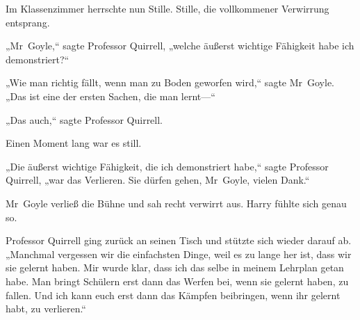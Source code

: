 Im Klassenzimmer herrschte nun Stille. Stille, die vollkommener Verwirrung entsprang.

„Mr~Goyle,“ sagte Professor Quirrell, „welche äußerst wichtige Fähigkeit habe ich demonstriert?“

„Wie man richtig fällt, wenn man zu Boden geworfen wird,“ sagte Mr~Goyle. „Das ist eine der ersten Sachen, die man lernt—“

„Das auch,“ sagte Professor Quirrell.

Einen Moment lang war es still.

„Die äußerst wichtige Fähigkeit, die ich demonstriert habe,“ sagte Professor Quirrell, „war das Verlieren. Sie dürfen gehen, Mr~Goyle, vielen Dank.“

Mr~Goyle verließ die Bühne und sah recht verwirrt aus. Harry fühlte sich genau so.

Professor Quirrell ging zurück an seinen Tisch und stützte sich wieder darauf ab. „Manchmal vergessen wir die einfachsten Dinge, weil es zu lange her ist, dass wir sie gelernt haben. Mir wurde klar, dass ich das selbe in meinem Lehrplan getan habe. Man bringt Schülern erst dann das Werfen bei, wenn sie gelernt haben, zu fallen. Und ich kann euch erst dann das Kämpfen beibringen, wenn ihr gelernt habt, zu verlieren.“

